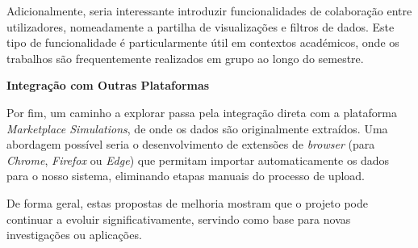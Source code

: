 Adicionalmente, seria interessante introduzir funcionalidades de colaboração entre utilizadores, nomeadamente a partilha de visualizações e filtros de dados. Este tipo de funcionalidade é particularmente útil em contextos académicos, onde os trabalhos são frequentemente realizados em grupo ao longo do semestre.

\textbf{Integração com Outras Plataformas}

Por fim, um caminho a explorar passa pela integração direta com a plataforma \textit{Marketplace Simulations}, de onde os dados são originalmente extraídos. Uma abordagem possível seria o desenvolvimento de extensões de \textit{browser} (para \textit{Chrome}, \textit{Firefox} ou \textit{Edge}) que permitam importar automaticamente os dados para o nosso sistema, eliminando etapas manuais do processo de upload.

De forma geral, estas propostas de melhoria mostram que o projeto pode continuar a evoluir significativamente, servindo como base para novas investigações ou aplicações.